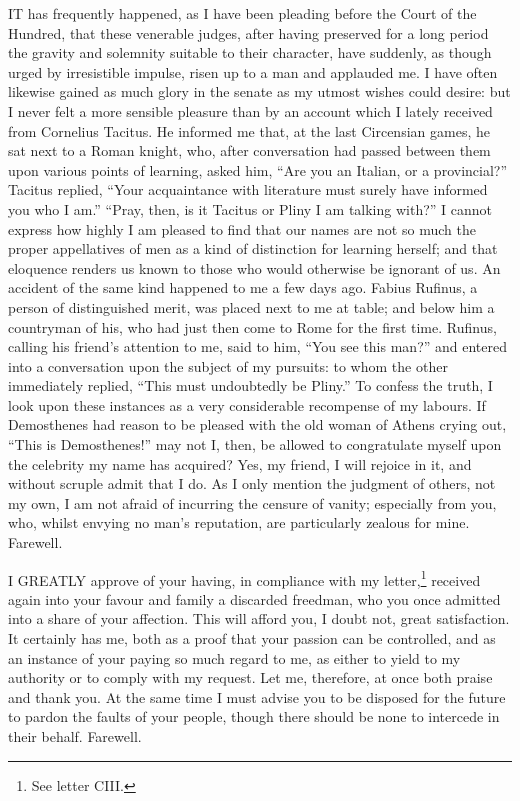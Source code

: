IT has frequently happened, as I have been pleading before the Court of
the Hundred, that these venerable judges, after having preserved for a
long period the gravity and solemnity suitable to their character, have
suddenly, as though urged by irresistible impulse, risen up to a man and
applauded me. I have often likewise gained as much glory in the senate as
my utmost wishes could desire: but I never felt a more sensible pleasure
than by an account which I lately received from Cornelius Tacitus. He
informed me that, at the last Circensian games, he sat next to a Roman
knight, who, after conversation had passed between them upon various
points of learning, asked him, ``Are you an Italian, or a provincial?''
Tacitus replied, ``Your acquaintance with literature must surely have informed
you who I am.'' ``Pray, then, is it Tacitus or Pliny I am talking with?'' I
cannot express how highly I am pleased to find that our names are not so
much the proper appellatives of men as a kind of distinction for learning
herself; and that eloquence renders us known to those who would otherwise
be ignorant of us. An accident of the same kind happened to me a few days
ago. Fabius Rufinus, a person of distinguished merit, was placed next to
me at table; and below him a countryman of his, who had just then come to
Rome for the first time. Rufinus, calling his friend's attention to me,
said to him, ``You see this man?'' and entered into a conversation upon the
subject of my pursuits: to whom the other immediately replied, ``This must
undoubtedly be Pliny.'' To confess the truth, I look upon these instances
as a very considerable recompense of my labours. If Demosthenes had reason
to be pleased with the old woman of Athens crying out, ``This is
Demosthenes!'' may not I, then, be allowed to congratulate myself upon the
celebrity my name has acquired? Yes, my friend, I will rejoice in it, and
without scruple admit that I do. As I only mention the judgment of others,
not my own, I am not afraid of incurring the censure of vanity; especially
from you, who, whilst envying no man's reputation, are particularly
zealous for mine. Farewell.


I GREATLY approve of your having, in compliance with my letter,\footnote{See letter CIII.}
received again into your favour and family a discarded freedman, who you
once admitted into a share of your affection. This will afford you, I
doubt not, great satisfaction. It certainly has me, both as a proof that
your passion can be controlled, and as an instance of your paying so much
regard to me, as either to yield to my authority or to comply with my
request. Let me, therefore, at once both praise and thank you. At the same
time I must advise you to be disposed for the future to pardon the faults
of your people, though there should be none to intercede in their behalf.
Farewell.


